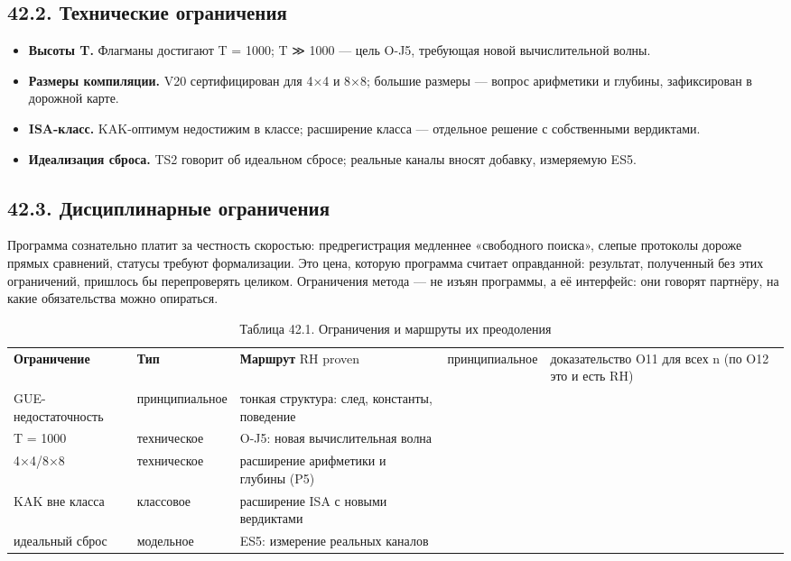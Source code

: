 \documentclass[11pt,a4paper]{article}
\begin{document}
\subsection{42.2. Технические ограничения}

\begin{itemize}
  \item \textbf{Высоты T.} Флагманы достигают T = 1000; T ≫ 1000 — цель O-J5, требующая новой вычислительной волны.
  \item \textbf{Размеры компиляции.} V20 сертифицирован для 4×4 и 8×8; большие размеры — вопрос арифметики и глубины, зафиксирован в дорожной карте.
  \item \textbf{ISA-класс.} KAK-оптимум недостижим в классе; расширение класса — отдельное решение с собственными вердиктами.
  \item \textbf{Идеализация сброса.} TS2 говорит об идеальном сбросе; реальные каналы вносят добавку, измеряемую ES5.
\end{itemize}

\subsection{42.3. Дисциплинарные ограничения}

Программа сознательно платит за честность скоростью: предрегистрация медленнее «свободного поиска», слепые протоколы дороже прямых сравнений, статусы требуют формализации. Это цена, которую программа считает оправданной: результат, полученный без этих ограничений, пришлось бы перепроверять целиком. Ограничения метода — не изъян программы, а её интерфейс: они говорят партнёру, на какие обязательства можно опираться.

\begin{table}[htbp]\centering\small
\caption{Таблица 42.1. Ограничения и маршруты их преодоления}
\begin{tabular}{p{} p{} p{}}
\toprule
\textbf{Ограничение} & \textbf{Тип} & \textbf{Маршрут}
\midrule
RH proven & принципиальное & доказательство O11 для всех n (по O12 это и есть RH) \\
GUE-недостаточность & принципиальное & тонкая структура: след, константы, поведение \\
T = 1000 & техническое & O-J5: новая вычислительная волна \\
4×4/8×8 & техническое & расширение арифметики и глубины (P5) \\
KAK вне класса & классовое & расширение ISA с новыми вердиктами \\
идеальный сброс & модельное & ES5: измерение реальных каналов \\
\bottomrule
\end{tabular}
\end{table}
\end{document}
